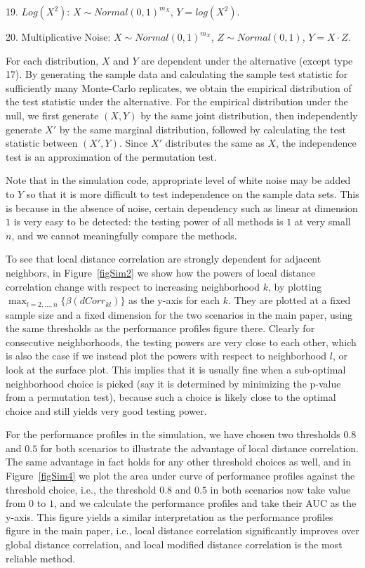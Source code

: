 \documentclass[12pt]{article}
\begin{document}
19. $Log(X^2)$: $X \sim Normal(0, 1)^{m_{X}}$, $Y=log(X^2)$.

20. Multiplicative Noise: $X \sim Normal(0, 1)^{m_{X}}$, $Z \sim Normal(0, 1)$, $Y=X \cdot Z$.

For each distribution, $X$ and $Y$ are dependent under the alternative (except type 17). By generating the sample data and calculating the sample test statistic for sufficiently many Monte-Carlo replicates, we obtain the empirical distribution of the test statistic under the alternative. For the empirical distribution under the null, we first generate $(X,Y)$ by the same joint distribution, then independently generate $X'$ by the same marginal distribution, followed by calculating the test statistic between $(X',Y)$. Since $X'$ distributes the same as $X$, the independence test is an approximation of the permutation test.

Note that in the simulation code, appropriate level of white noise may be added to $Y$ so that it is more difficult to test independence on the sample data sets. This is because in the absence of noise, certain dependency such as linear at dimension $1$ is very easy to be detected: the testing power of all methods is $1$ at very small $n$, and we cannot meaningfully compare the methods.

To see that local distance correlation are strongly dependent for adjacent neighbors, in Figure~\ref{figSim2} we show how the powers of local distance correlation change with respect to increasing neighborhood $k$, by plotting $\max_{l=2,\ldots,n} \{\beta(dCorr_{kl})\}$ as the y-axis for each $k$. They are plotted at a fixed sample size and a fixed dimension for the two scenarios in the main paper, using the same thresholds as the performance profiles figure there. Clearly for consecutive neighborhoods, the testing powers are very close to each other, which is also the case if we instead plot the powers with respect to neighborhood $l$, or look at the surface plot. This implies that it is usually fine when a sub-optimal neighborhood choice is picked (say it is determined by minimizing the p-value from a permutation test), because such a choice is likely close to the optimal choice and still yields very good testing power.

For the performance profiles in the simulation, we have chosen two thresholds $0.8$ and $0.5$ for both scenarios to illustrate the advantage of local distance correlation. The same advantage in fact holds for any other threshold choices as well, and in Figure~\ref{figSim4} we plot the area under curve of performance profiles against the threshold choice, i.e., the threshold $0.8$ and $0.5$ in both scenarios now take value from $0$ to $1$, and we calculate the performance profiles and take their AUC as the y-axis. This figure yields a similar interpretation as the performance profiles figure in the main paper, i.e., local distance correlation significantly improves over global distance correlation, and local modified distance correlation is the most reliable method.
\end{document}
